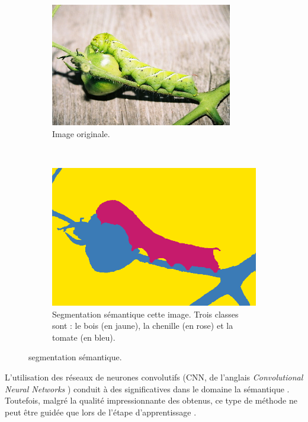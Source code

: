\begin{figure}[htb]
\centering
	 \begin{subfigure}[t]{0.3\textwidth}	
			\includegraphics[width=\textwidth]{images/etat-de-l-art/img-065-im}
		 \caption{Image originale. }
	\end{subfigure}
	~
	 \begin{subfigure}[t]{0.3\textwidth}	
			\includegraphics[width=\textwidth]{images/etat-de-l-art/img-065-seg-semantique}
		 \caption{Segmentation sémantique  cette image. Trois classes sont  : le bois (en jaune), la chenille (en rose) et la tomate (en bleu).}
	\end{subfigure}
	\caption{ segmentation sémantique.}
	\label{fig:sota:seg-sem-ex}
\end{figure}


L'utilisation des réseaux de neurones convolutifs (CNN, de l'anglais \og \emph{Convolutional Neural Networks} \fg)  conduit à des  significatives dans le domaine la  sémantique  \cite{fourure2017multi,garcia2017review,long2015fully}. Toutefois, malgré la qualité impressionnante des  obtenus,  ce type de méthode ne peut être guidée que lors de l'étape d'apprentissage \cite{lin2016scribblesup}. 

